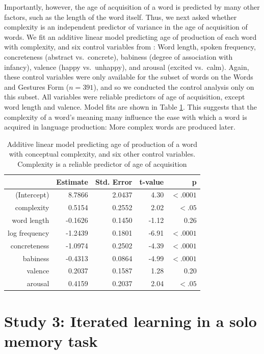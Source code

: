 Importantly, however, the age of acquisition of a word is predicted by many other factors, such as the length of the word itself. Thus, we next asked whether complexity is an independent predictor of variance in the age of acquisition of words. We fit an additive linear model predicting age of production of each word with complexity, and six control variables from : Word length, spoken frequency, concreteness (abstract vs.\ concrete), babiness (degree of association with infancy), valence (happy vs.\ unhappy), and arousal (excited vs.\ calm).  Again, these control variables were only available for the subset of words on the Words and Gestures Form ($n = 391$), and so we conducted the control analysis only on this subset. All variables were reliable predictors of age of acquisition, except word length and valence. Model fits are shown in Table \ref{tab:aoapred}. This suggests that the complexity of a word's meaning many influence the ease with which a word is acquired in language production: More complex words are produced later.


\begin{table}[t!]
\centering
\begin{tabular}{rrrrr}
  \hline
 & Estimate & Std. Error & t-value & p\\ 
  \hline
(Intercept) & 8.7866 & 2.0437 & 4.30 & $<.0001$ \\ 
  complexity & 0.5154 & 0.2552 & 2.02 & $<.05$ \\ 
  word length & -0.1626 & 0.1450 & -1.12 & 0.26\\ 
  log frequency  & -1.2439 & 0.1801 & -6.91 & $<.0001$ \\ 
  concreteness & -1.0974 & 0.2502 & -4.39 & $<.0001$\\ 
  babiness & -0.4313 & 0.0864 & -4.99 &$<.0001$\\ 
  valence & 0.2037 & 0.1587 & 1.28 & 0.20 \\ 
  arousal & 0.4159 & 0.2037 & 2.04 &$ <.05$ \\ 
   \hline
\end{tabular}
\caption{Additive linear model predicting age of production of a word with conceptual complexity, and six other control variables. Complexity is a reliable predictor of age of acquisition}
  \label{tab:aoapred}
\end{table}




\section{Study 3: Iterated learning in a solo memory task}

